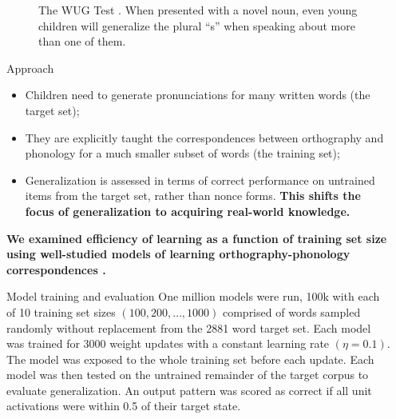 \documentclass[final]{beamer}
\newlength{\sepwid}
\newlength{\onecolwid}
\begin{document}
\begin{frame}[t]
\begin{columns}[t]
\begin{column}{\onecolwid}
\begin{figure}[h]
  \centering
  \def\svgwidth{0.7\linewidth}
  
  \caption{The WUG Test \cite{Berko1958}. When presented with a novel noun, even young children will generalize the plural ``s'' when speaking about more than one of them.}
  \label{fig:wug}
\end{figure}

\begin{block}{Approach}
  \begin{itemize}
    \item Children need to generate pronunciations for many written words (the target set);
    \item They are explicitly taught the correspondences between orthography and phonology for a much smaller subset of words (the training set);
    \item Generalization is assessed in terms of correct performance on untrained items from the target set, rather than nonce forms. \textbf{This shifts the focus of generalization to acquiring real-world knowledge.}
  \end{itemize}

  \vspace{1em}
    \textbf{We examined efficiency of learning as a function of training set size using well-studied models of learning orthography-phonology correspondences \cite{Seidenberg1989,Harm1999}.}
\end{block}

\begin{block}{Model training and evaluation}
One million models were run, 100k with each of 10 training set sizes $(100,200,\dots,1000)$ comprised of words sampled randomly without replacement from the 2881 word target set.
Each model was trained for 3000 weight updates with a constant learning rate $(\eta=0.1)$.
The model was exposed to the whole training set before each update.
Each model was then tested on the untrained remainder of the target corpus to evaluate generalization.
An output pattern was scored as correct if all unit activations were within 0.5 of their target state.
\end{block}

\end{column} %

\begin{column}{\sepwid}\end{column} %


\end{columns}
\end{frame}
\end{document}
